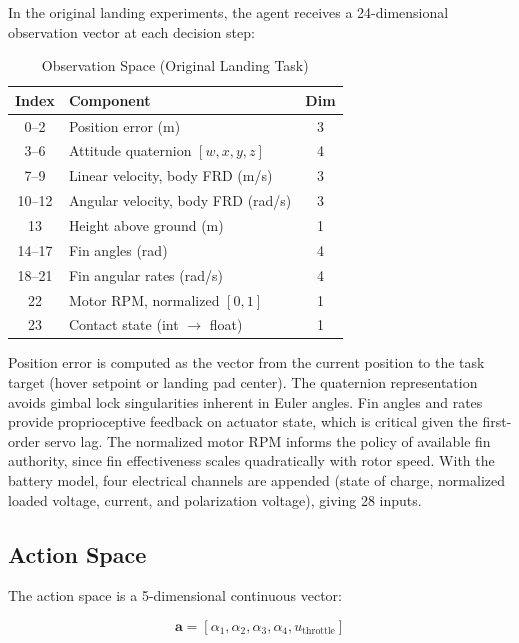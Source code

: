 \documentclass[conference]{IEEEtran}
\begin{document}
In the original landing experiments, the agent receives a 24-dimensional observation vector at each decision step:

\begin{table}[htbp]
\caption{Observation Space (Original Landing Task)}
\label{tab:obs_space}
\centering
\begin{tabular}{clc}
\toprule
\textbf{Index} & \textbf{Component} & \textbf{Dim} \\
\midrule
0--2 & Position error (m) & 3 \\
3--6 & Attitude quaternion $[w,x,y,z]$ & 4 \\
7--9 & Linear velocity, body FRD (m/s) & 3 \\
10--12 & Angular velocity, body FRD (rad/s) & 3 \\
13 & Height above ground (m) & 1 \\
14--17 & Fin angles (rad) & 4 \\
18--21 & Fin angular rates (rad/s) & 4 \\
22 & Motor RPM, normalized $[0,1]$ & 1 \\
23 & Contact state (int $\to$ float) & 1 \\
\bottomrule
\end{tabular}
\end{table}

Position error is computed as the vector from the current position to the task target (hover setpoint or landing pad center). The quaternion representation avoids gimbal lock singularities inherent in Euler angles. Fin angles and rates provide proprioceptive feedback on actuator state, which is critical given the first-order servo lag. The normalized motor RPM informs the policy of available fin authority, since fin effectiveness scales quadratically with rotor speed. With the battery model, four electrical channels are appended (state of charge, normalized loaded voltage, current, and polarization voltage), giving 28 inputs.

\subsection{Action Space}

The action space is a 5-dimensional continuous vector:

\begin{equation}
\mathbf{a} = [\alpha_1, \alpha_2, \alpha_3, \alpha_4, u_{\text{throttle}}]
\label{eq:action}
\end{equation}
\end{document}
